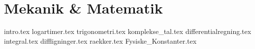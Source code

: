 \documentclass[crop=false, class=memoir]{standalone}
\begin{document}
\chapter{Mekanik \& Matematik} \label{sec:matematik}
{intro.tex}
{logartimer.tex}
{trigonometri.tex}
{komplekse_tal.tex}
{differentialregning.tex}
{integral.tex}
{diffligninger.tex}
{raekker.tex}
\newpage
{Fysiske_Konstanter.tex}

\nocite{stewartCalculusConceptsContexts2006}
\nocite{youngSearsZemanskyUniversity2016}
\nocite{arfkenMathematicalMethodsPhysicists2013}
\nocite{taylorClassicalMechanics2005}
\end{document}
